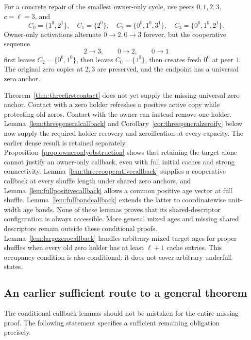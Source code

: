\documentclass[11pt]{article}
\begin{document}
For a concrete repair of the smallest owner-only
cycle, use peers $0,1,2,3$, $c=\ell=3$, and
\[
 C_0=\{1^0,2^1\},\quad C_1=\{2^0\},\quad
 C_2=\{0^0,1^0,3^1\},\quad
 C_3=\{0^0,1^0,2^1\}.
\]
Owner-only activations alternate $0\to2,0\to3$
forever, but the cooperative sequence
\[
 2\to3,\qquad0\to2,\qquad0\to1
\]
first leaves $C_2=\{0^0,1^0\}$, then leaves
$C_0=\{1^0\}$, then creates fresh $0^0$ at peer $1$.
The original zero copies at $2,3$ are preserved,
and the endpoint has a universal zero anchor.

Theorem~\ref{thm:threefirstcontact} does not yet supply
the missing universal zero anchor. Contact with a
zero holder refreshes a positive active copy while
protecting old zeros. Contact with the owner can
instead remove one holder. Lemma~\ref{lem:threegeneralcallback}
and Corollary~\ref{cor:threegeneralzeroify} below now supply
the required holder recovery and zeroification at every
capacity. The earlier dense result is retained separately.
Proposition~\ref{prop:owneronlyobstruction} shows
that retaining the target alone cannot justify an
owner-only callback, even with full initial caches
and strong connectivity. Lemma~\ref{lem:threecooperativecallback}
supplies a cooperative callback at every shuffle
length under shared zero anchors, and
Lemma~\ref{lem:fullpositivecallback} allows a common
positive age vector at full shuffle. Lemma~\ref{lem:fullbandcallback}
extends the latter to coordinatewise unit-width age bands.
None of these lemmas proves that its shared-descriptor
configuration is always accessible. More general mixed ages
and missing shared descriptors remain outside these conditional proofs.
Lemma~\ref{lem:largezerocallback} handles arbitrary
mixed target ages for proper shuffles when every
old zero holder has at least $\ell+1$ cache entries.
This occupancy condition is also conditional: it
does not cover arbitrary underfull states.

\subsection{An earlier sufficient route to a general theorem}

The conditional callback lemmas should not be mistaken
for the entire missing proof. The following statement
specifies a sufficient remaining obligation precisely.
\end{document}
